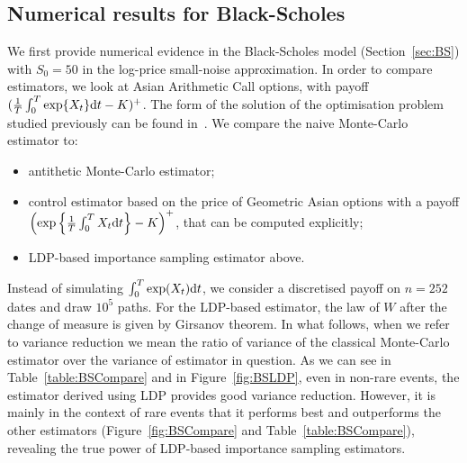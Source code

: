 \subsection{Numerical results for Black-Scholes}\label{sec:BS_numerical_results}
We first provide numerical evidence in the Black-Scholes model (Section~\ref{sec:BS}) with $S_0=50$ in the log-price small-noise approximation.
In order to compare estimators, we look at Asian Arithmetic Call options, 
with payoff $(\frac{1}{T}\int_0^T \exp\{X_t\} \mathrm{d} t - K)^+$. The form of the solution of the optimisation problem studied previously can be found in~\cite{Guasoni2007OptimalTime}. We compare the naive Monte-Carlo estimator to: 
\begin{itemize}
    \item antithetic Monte-Carlo estimator;
    \item control estimator based on the price of Geometric Asian options with a payoff
    $\left(\exp\left\{\frac{1}{T}\int_0^T X_t \mathrm{d} t\right\} - K\right)^+$,
    that can be computed explicitly;
    \item LDP-based importance sampling estimator above.
\end{itemize}
Instead of simulating $\int_0^T \exp(X_t)\mathrm{d} t$, we consider a discretised payoff on $n=252$ dates and draw $10^5$ paths.
For the LDP-based estimator, the law of $W$ after the change of measure is given by Girsanov theorem.
In what follows, when we refer to variance reduction we mean the ratio of variance of the classical Monte-Carlo estimator over the variance of estimator in question.
As we can see in Table~\ref{table:BSCompare} and in Figure~\ref{fig:BSLDP}, 
even in non-rare events, the estimator derived using LDP provides good variance reduction. 
However, it is mainly in the context of rare events that it performs best and outperforms the other estimators (Figure~\ref{fig:BSCompare} and Table~\ref{table:BSCompare}), 
revealing the true power of LDP-based importance sampling estimators.

